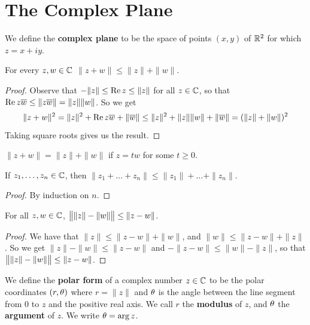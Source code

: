 \section{The Complex Plane}

\begin{definition}
    We define the \textbf{complex plane} to be the space of points $(x,y)$ of
    $\mathbb{R}^2$ for which  $z=x+iy$.
\end{definition}

\begin{lemma}\label{1.2.1}
    For every $z,w \in \mathbb{C}$  $\|z+w\| \leq \|z\|+\|w\|$.
\end{lemma}
\begin{proof}
    Observe that $-\|z\| \leq \operatorname{Re}{z} \leq \|z\|$ for all $z \in \mathbb{C}$, so that
    $\operatorname{Re}{z\overline{w}} \leq \|z\overline{w}\|=\|z\|\|w\|$. So we get
    \begin{equation*}
        \|z+w\|^2=\|z\|^2+\operatorname{Re}{z\overline{w}}+\|\overline{w}\| \leq
        \|z\|^2+\|z\|\|w\|+\|\overline{w}\|=(\|z\|+\|w\|)^2
    \end{equation*}
    Taking square roots gives us the result.
\end{proof}
\begin{corollary}
    $\|z+w\|=\|z\|+\|w\|$ if  $z=tw$ for some  $t \geq 0$.
\end{corollary}
\begin{corollary}
    If $z_1, \dots, z_n \in \mathbb{C}$, then $\|z_1+\dots+z_n\| \leq
    \|z_1\|+\dots+\|z_n\|$.
\end{corollary}
\begin{proof}
    By induction on $n$.
\end{proof}
\begin{corollary}
    For all $z,w \in \mathbb{C}$,  $\big{\|}\|z\|-\|w\|\big{\|} \leq \|z-w\|$.
\end{corollary}
\begin{proof}
    We have that $\|z\| \leq \|z-w\|+\|w\|$, and $\|w\| \leq \|z-w\|+\|z\|$. So
    we get $\|z\|-\|w\| \leq \|z-w\|$ and $-\|z-w\| \leq \|w\|-\|z\|$, so that
    $\big{\|}\|z\|-\|w\|\big{\|} \leq \|z-w\|$.
\end{proof}

\begin{definition}
    We define the \textbf{polar form} of a complex number $z \in \mathbb{C}$ to be the
    polar coordinates  $(r,\theta)$ where $r=\|z\|$ and  $\theta$ is the angle between
    the line segment from  $0$ to  $z$ and the positive real axis. We call  $r$
    the \textbf{modulus} of $z$, and  $\theta$ the  \textbf{argument} of $z$. We
    write $\theta=\arg{z}$.
\end{definition}

